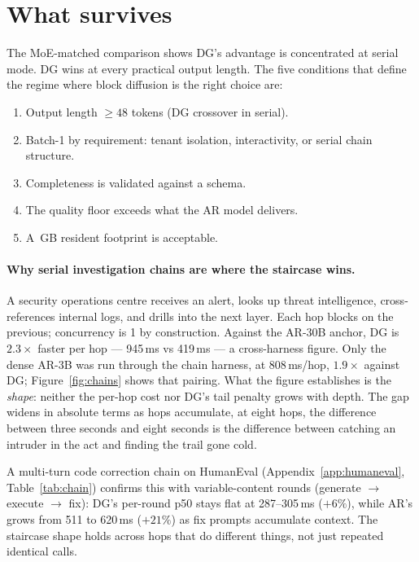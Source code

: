 \section{What survives}
\label{sec:survives}

The MoE-matched comparison shows DG's advantage is concentrated at
serial mode. DG wins at every practical output length. The five
conditions that define the regime where block diffusion is the right
choice are:
\begin{enumerate}[nosep]
  \item Output length $\geq 48$ tokens (DG crossover in serial).
  \item Batch-1 by requirement: tenant isolation, interactivity, or
    serial chain structure.
  \item Completeness is validated against a schema.
  \item The quality floor exceeds what the AR model delivers.
  \item A \dgWeights\,GB resident footprint is acceptable.
\end{enumerate}

\paragraph{Why serial investigation chains are where the staircase wins.}

A security operations centre receives an alert, looks up threat
intelligence, cross-references internal logs, and drills into the next
layer. Each hop blocks on the previous; concurrency is 1 by
construction. Against the AR-30B anchor, DG is $2.3\times$ faster per
hop --- 945\,ms vs 419\,ms --- a cross-harness figure. Only the dense
AR-3B was run through the chain harness, at 808\,ms/hop, $1.9\times$
against DG; Figure~\ref{fig:chains} shows that pairing. What the
figure establishes is the \emph{shape}: neither the per-hop cost nor
DG's tail penalty grows with depth. The gap widens in absolute terms
as hops accumulate, at eight hops, the difference between three
seconds and eight seconds is the difference between catching an
intruder in the act and finding the trail gone cold.

A multi-turn code correction chain on HumanEval
(Appendix~\ref{app:humaneval}, Table~\ref{tab:chain}) confirms this
with variable-content rounds (generate $\to$ execute $\to$ fix):
DG's per-round p50 stays flat at 287--305\,ms ($+6\%$), while AR's
grows from 511 to 620\,ms ($+21\%$) as fix prompts accumulate
context. The staircase shape holds across hops that do different
things, not just repeated identical calls.

